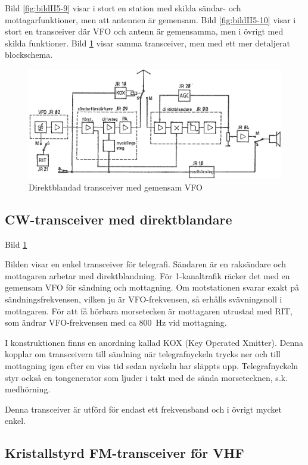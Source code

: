 Bild \ref{fig:bildII5-9} visar i stort en station med skilda sändar- och
mottagarfunktioner, men att antennen är gemensam.  Bild \ref{fig:bildII5-10} visar
i stort en transceiver där VFO och antenn är gemensamma, men i övrigt
med skilda funktioner.  Bild \ref{fig:bildII5-11} visar samma transceiver, men med
ett mer detaljerat blockschema.

\begin{figure}
  \includegraphics[width=\textwidth]{images/bild_2_5-11.png}
  \caption{Direktblandad transceiver med gemensam VFO}
  \label{fig:bildII5-11}
\end{figure}

\subsection{CW-transceiver med direktblandare}

Bild \ref{fig:bildII5-11}

Bilden visar en enkel transceiver för telegrafi. Sändaren är en
raksändare och mottagaren arbetar med direktblandning. För
1-kanaltrafik räcker det med en gemensam VFO för sändning och
mottagning. Om motstationen svarar exakt på sändningsfrekvensen,
vilken ju är VFO-frekvensen, så erhålls svävningsnoll i
mottagaren. För att få hörbara morsetecken är mottagaren utrustad med
RIT, som ändrar VFO-frekvensen med ca 800~Hz vid mottagning.

I konstruktionen finns en anordning kallad KOX (Key Operated
Xmitter). Denna kopplar om transceivern till sändning när
telegrafnyckeln trycks ner och till mottagning igen efter en viss tid
sedan nyckeln har släppts upp. Telegrafnyckeln styr också en
tongenerator som ljuder i takt med de sända morsetecknen,
s.k. medhörning.

Denna transceiver är utförd för endast ett frekvensband och i övrigt
mycket enkel.

\subsection{Kristallstyrd FM-transceiver för VHF}

